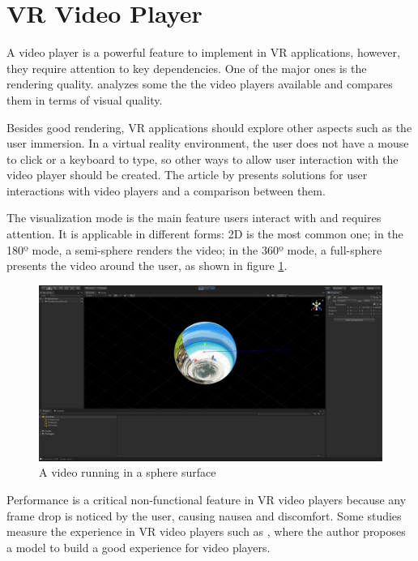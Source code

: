 \documentclass[runningheads]{llncs}
\begin{document}
\section{VR Video Player}

A video player is a powerful feature to implement in VR applications, however, they require attention to key dependencies. One of the major ones is the rendering quality. \cite{sari2018comparative} analyzes some the the video players available and compares them in terms of visual quality.

Besides good rendering, VR applications should explore other aspects such as the user immersion. In a virtual reality environment, the user does not have a mouse to click or a keyboard to type, so other ways to allow user interaction with the video player should be created. The article by \cite{pakkanen2017interaction} presents solutions for user interactions with video players and a comparison between them.

The visualization mode is the main feature users interact with and requires attention. It is applicable in different forms: 2D is the most common one; in the 180º mode, a semi-sphere renders the video; in the 360º mode, a full-sphere presents the video around the user, as shown in figure \ref{video-360}.

\begin{figure}[h!]
    \centerline{\includegraphics[scale=0.22]{images/Video_Sphere.png}}
    \caption{A video running in a sphere surface}
    \label{video-360}
\end{figure}

Performance is a critical non-functional feature in VR video players because any frame drop is noticed by the user, causing nausea and discomfort. Some studies measure the experience in VR video players such as \cite{yao2019towards}, where the author proposes a model to build a good experience for video players.
\end{document}
